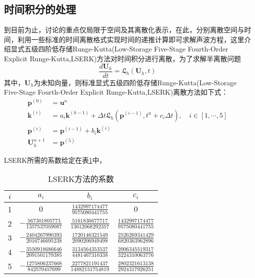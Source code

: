 \documentclass[12pt]{article}
\newcommand{\upcite}[1]{\textsuperscript{\textsuperscript{\cite{#1}}}}
\begin{document}
\subsection{时间积分的处理}
到目前为止，讨论的重点仅局限于空间及其离散化表示，在此，分别离散空间与时间，利用一些标准的时间离散格式实现时间的递推计算即可求解声波方程，这里介绍显式五级四阶低存储Runge-Kutta(Low-Storage Five-Stage Fourth-Order Explicit Runge-Kutta,LSERK)方法对时间积分进行离散\upcite{Carpenter1994}，为了求解半离散问题
\begin{equation}\label{2-63}
\frac{d\boldsymbol{U}_h}{dt}=\mathfrak{L}_h(\boldsymbol{U}_h,t)
\end{equation}
其中，$\boldsymbol{U}_h$为未知向量，则标准显式五级四阶低存储Runge-Kutta(Low-Storage Five-Stage Fourth-Order Explicit Runge-Kutta,LSERK)离散方法如下式：
\begin{equation}\label{2-64}
\begin{split}
\boldsymbol{p}^{(0)}&=\boldsymbol{u}^n \\ 
\boldsymbol{k}^{(i)}&=a_i\boldsymbol{k}^{(k-1)}+\Delta t \mathfrak{L}_h(\boldsymbol{p}^{(i-1)},t^n+c_i\Delta t),\quad i \in [1,\cdots,5] \\
\boldsymbol{p}^{(i)}&=\boldsymbol{p}^{(i-1)}+b_i\boldsymbol{k}^{(i)}\\
\boldsymbol{U}_h^{n+1} &= \boldsymbol{p}^{(5)}
\end{split}
\end{equation}
\par
LSERK所需的系数给定在表\ref{LSERKTab}中，
\begin{table}[H]
\centering
\caption{LSERK方法的系数}\label{LSERKTab}
\renewcommand\tabcolsep{2em}
\begin{tabular}{cccc}
\toprule
{$i$} & {$a_i$}  & {$b_i$} & {$c_i$} \\
\midrule 
1 & $0$ & $\frac{1432997174477}{9575080441755}$ & $0$\\

2 & $-\frac{567301805773}{1357537059087}$ & $\frac{5161836677717}{13612068292357}$ & $\frac{1432997174477}{9575080441755}$\\

3 & $-\frac{2404267990393}{2016746695238}$ & $\frac{1720146321549}{2090206949498}$ & $\frac{2526269341429}{6820363962896}$\\

4 & $-\frac{3550918686646}{2091501179385}$ & $\frac{3134564353537}{4481467310338}$ & $\frac{2006345519317}{3224310063776}$\\

5 & $-\frac{1275806237668}{842570457699}$ & $\frac{2277821191437}{14882151754819}$ & $\frac{2802321613138}{2924317926251}$\\
\bottomrule
\end{tabular}
\end{table}
\end{document}
